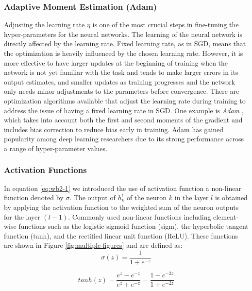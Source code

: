 \subsubsection{Adaptive Moment Estimation (Adam)}
Adjusting the learning rate $\eta$ is one of the most crucial steps in fine-tuning the hyper-parameters for the neural networks. The learning of the neural network is directly affected by the learning rate. Fixed learning rate, as in SGD, means that the optimization is heavily influenced by the chosen learning rate. However, it is more effective to have larger updates at the beginning of training when the network is not yet familiar with the task and tends to make larger errors in its output estimates, and smaller updates as training progresses and the network only needs minor adjustments to the parameters before convergence. There are optimization algorithms available that adjust the learning rate during training to address the issue of having a fixed learning rate in SGD. One example is \textit{Adam} \cite{kingma2014adam}, which takes into account both the first and second moments of the gradient and includes bias correction to reduce bias early in training. Adam has gained popularity among deep learning researchers due to its strong performance across a range of hyper-parameter values.

\subsubsection{Activation Functions}
In equation \ref{eq:wb2-1} we introduced the use of activation function a non-linear function denoted by $\sigma$.  The output of $h_{k}^{l}$ of the neuron $k$ in the layer $l$ is obtained by applying the activation function to the weighted sum of the neuron outputs for the layer $(l-1)$. Commonly
used non-linear functions including element-wise functions such as the logistic sigmoid function (sigm), the hyperbolic tangent function (tanh), and the rectified linear unit function (ReLU). These functions are  shown in Figure \ref{fig:multiple-figures} and are defined as: 
\begin{equation}
    \label{eq:sigmoid}
    \sigma(z) = \frac{1} {1 + e^{-z}}
\end{equation}

\begin{equation}
    \label{eq:tanh}
    tanh(z) = \frac{e^z - e^{-z}}{e^z + e^{-z}} = \frac{1 - e^{-2z}}{1 + e^{-2z}}
\end{equation}


